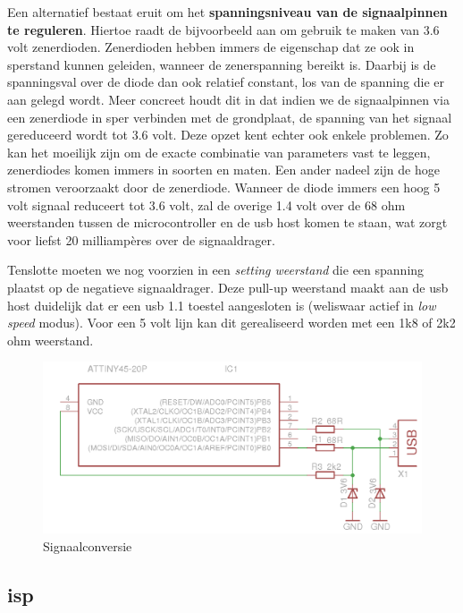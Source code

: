 Een alternatief bestaat eruit om het \textbf{spanningsniveau van de signaalpinnen te reguleren}. Hiertoe raadt de  bijvoorbeeld aan om gebruik te maken van 3.6 volt zenerdioden. Zenerdioden hebben immers de eigenschap dat ze ook in sperstand kunnen geleiden, wanneer de zenerspanning bereikt is. Daarbij is de spanningsval over de diode dan ook relatief constant, los van de spanning die er aan gelegd wordt. Meer concreet houdt dit in dat indien we de signaalpinnen via een zenerdiode in sper verbinden met de grondplaat, de spanning van het signaal gereduceerd wordt tot 3.6 volt. Deze opzet kent echter ook enkele problemen. Zo kan het moeilijk zijn om de exacte combinatie van parameters vast te leggen, zenerdiodes komen immers in soorten en maten. Een ander nadeel zijn de hoge stromen veroorzaakt door de zenerdiode. Wanneer de diode immers een hoog 5 volt signaal reduceert tot 3.6 volt, zal de overige 1.4 volt over de 68 ohm weerstanden tussen de microcontroller en de \ac{usb} host komen te staan, wat zorgt voor liefst 20 milliampères over de signaaldrager.

Tenslotte moeten we nog voorzien in een \emph{setting weerstand} die een spanning plaatst op de negatieve signaaldrager. Deze pull-up weerstand maakt aan de \ac{usb} host duidelijk dat er een \ac{usb} 1.1 toestel aangesloten is (weliswaar actief in \emph{low speed} modus). Voor een 5 volt lijn kan dit gerealiseerd worden met een 1k8 of 2k2 ohm weerstand.

\begin{figure}
	\includegraphics[width=\textwidth]{afbeeldingen/inputmodule_signaal}
	\caption{Signaalconversie}
\end{figure}

\subsection{\acs{isp}}


